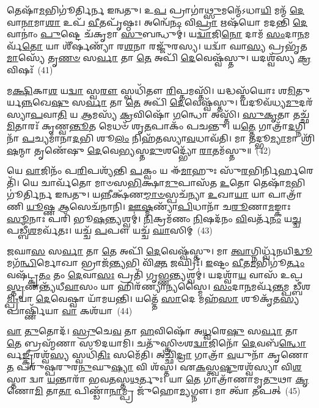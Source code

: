 𑌤𑍇𑌷𑌾᳴\-\ul{𑌮}\-𑌭𑌿𑌗𑍂॑𑌰𑍍𑌤𑌿𑌰𑍍𑌨 𑌇𑌨𑍍𑌵𑌤𑍁। 𑌉\-\ul{𑌪} 𑌪𑍍𑌰𑌾𑌗𑌾॑\-\ul{𑌥𑍍𑌸𑍁}\-𑌮𑌨𑍍𑌮𑍇᳴\-𑌽𑌧𑌾\-\ul{𑌯𑌿} 𑌮𑌨𑍍𑌮᳴ \ul{𑌦𑍇}\-𑌵𑌾\-\ul{𑌨𑌾}\-𑌮𑌾\-\ul{𑌶𑌾} 𑌉𑌪᳴ \ul{𑌵𑍀}\-𑌤𑌪𑍃᳴𑌷𑍍𑌠𑌃। 𑌅𑌨𑍍𑌵𑍇᳴\-\ul{𑌨𑌂} 𑌵𑌿\-\ul{𑌪𑍍𑌰𑌾} 𑌋𑌷᳴𑌯𑍋 𑌮𑌦𑌨𑍍𑌤𑌿 \ul{𑌦𑍇}\-𑌵𑌾𑌨𑌾𑌂॑ \ul{𑌪𑍁}\-𑌷𑍍𑌟𑍇 𑌚᳴𑌕𑍃𑌮𑌾 \ul{𑌸𑍁}\-𑌬𑌨𑍍𑌧𑍁𑌮𑍍॑। 𑌯\-\ul{𑌦𑍍𑌵𑌾}\-𑌜𑌿\-\ul{𑌨𑍋} 𑌦𑌾𑌮᳴ \ul{𑌸𑌂}\-𑌦𑌾\-\ul{𑌨}\-𑌮𑌰𑍍𑌵᳴\-\ul{𑌤𑍋} 𑌯𑌾 𑌶𑍀᳴𑌰𑍍\mbox{}\-\ul{𑌷}\-𑌣𑍍𑌯𑌾᳴ 𑌰\-\ul{𑌶}\-𑌨𑌾 𑌰𑌜𑍍𑌜𑍁᳴𑌰𑌸𑍍𑌯। 𑌯𑌦𑍍𑌵𑌾᳴ 𑌘𑌾\-\ul{𑌸𑍍𑌯} 𑌪𑍍𑌰𑌭𑍃᳴𑌤\-\ul{𑌮𑌾}\-𑌸𑍍𑌯𑍇᳴ 𑌤𑍃\-\ul{𑌣}\-\-\ul{𑍞} 𑌸\-\ul{𑌰𑍍𑌵𑌾} 𑌤𑌾 \ul{𑌤𑍇} 𑌅𑌪𑌿᳴ \ul{𑌦𑍇}\-𑌵𑍇𑌷𑍍𑌵᳴𑌸𑍍𑌤𑍁। 𑌯𑌦𑌶𑍍𑌵᳴𑌸𑍍𑌯 \ul{𑌕𑍍𑌰}\-𑌵𑌿𑌷𑌃᳴~(41)

𑌮\-\ul{𑌕𑍍𑌷𑌿}\-𑌕𑌾\-\ul{𑌶} 𑌯\-\ul{𑌦𑍍𑌵𑌾} 𑌸𑍍𑌵\-\ul{𑌰𑍗} 𑌸𑍍𑌵𑌧𑌿᳴𑌤𑍗 \ul{𑌰𑌿}\-𑌪𑍍𑌤𑌮𑌸𑍍𑌤𑌿᳴। 𑌯𑌦𑍍𑌧𑌸𑍍𑌤᳴𑌯𑍋𑌃 𑌶\-\ul{𑌮𑌿}\-𑌤𑍁𑌰𑍍𑌯\-\ul{𑌨𑍍𑌨}\-𑌖𑍇\-\ul{𑌷𑍁} 𑌸\-\ul{𑌰𑍍𑌵𑌾} 𑌤𑌾 \ul{𑌤𑍇} 𑌅𑌪𑌿᳴ \ul{𑌦𑍇}\-𑌵𑍇𑌷𑍍𑌵᳴𑌸𑍍𑌤𑍁। 𑌯𑌦𑍂𑌵᳴𑌧𑍍𑌯\-\ul{𑌮𑍁}\-𑌦𑌰᳴𑌸𑍍𑌯𑌾\-\ul{𑌪}\-𑌵𑌾\-\ul{𑌤𑌿} 𑌯 \ul{𑌆}\-𑌮𑌸𑍍𑌯᳴ \ul{𑌕𑍍𑌰}\-𑌵𑌿𑌷𑍋᳴ \ul{𑌗}\-𑌨𑍍𑌧𑍋 𑌅𑌸𑍍𑌤𑌿᳴। \ul{𑌸𑍁}\-\-\ul{𑌕𑍃}\-𑌤𑌾 𑌤𑌚𑍍𑌛᳴\-\ul{𑌮𑌿}\-𑌤𑌾𑌰𑌃᳴ 𑌕𑍃𑌣𑍍𑌵\-\ul{𑌨𑍍𑌤𑍂}\-𑌤 𑌮𑍇𑌧𑍞᳴ 𑌶𑍃\-\ul{𑌤}\-𑌪𑌾𑌕𑌂᳴ 𑌪𑌚𑌨𑍍𑌤𑍁। 𑌯\-\ul{𑌤𑍍𑌤𑍇} 𑌗𑌾𑌤𑍍𑌰𑌾᳴\-\ul{𑌦}\-𑌗𑍍𑌨𑌿𑌨𑌾᳴ \ul{𑌪}\-𑌚𑍍𑌯𑌮𑌾᳴𑌨𑌾\-\ul{𑌦}\-𑌭𑌿 𑌶𑍂\-\ul{𑌲𑌂} 𑌨𑌿𑌹᳴𑌤𑌸𑍍𑌯𑌾\-\ul{𑌵}\-𑌧𑌾𑌵᳴𑌤𑌿। 𑌮𑌾 𑌤𑌦𑍍𑌭𑍂\-\ul{𑌮𑍍𑌯𑌾}\-𑌮𑌾 𑌶𑍍𑌰𑌿᳴\-\ul{𑌷}\-𑌨𑍍𑌮𑌾 𑌤𑍃𑌣𑍇᳴𑌷𑍁 \ul{𑌦𑍇}\-𑌵𑍇\-\ul{𑌭𑍍𑌯}\-𑌸𑍍𑌤\-\ul{𑌦𑍁}\-𑌶𑌦𑍍𑌭𑍍𑌯𑍋᳴ \ul{𑌰𑌾}\-𑌤𑌮᳴𑌸𑍍𑌤𑍁॥~(42)

{\anuvakamend[{𑌇\-\ul{𑌦𑍁}\-𑌤𑍋 \ul{𑌕𑍍𑌰}\-𑌵𑌿𑌷𑌃᳴ 𑌶𑍍𑌰𑌿𑌷\-\ul{𑌥𑍍𑌸}\-𑌪𑍍𑌤 𑌚᳴}]}%

𑌯𑍇 \ul{𑌵𑌾}\-𑌜𑌿𑌨𑌂᳴ 𑌪\-\ul{𑌰𑌿}\-𑌪𑌶𑍍𑌯᳴𑌨𑍍𑌤𑌿 \ul{𑌪}\-𑌕𑍍𑌵𑌂 𑌯 𑌈᳴\-\ul{𑌮𑌾}\-𑌹𑍁𑌃 𑌸𑍁᳴\-\ul{𑌰}\-𑌭𑌿𑌰𑍍𑌨𑌿𑌰𑍍\mbox{}\-\ul{𑌹}\-𑌰𑍇𑌤𑌿᳴। 𑌯𑍇 𑌚𑌾𑌰𑍍𑌵᳴𑌤𑍋 𑌮𑌾𑍞𑌸\-\ul{𑌭𑌿}\-𑌕𑍍𑌷𑌾\-\ul{𑌮𑍁}\-𑌪𑌾𑌸᳴𑌤 \ul{𑌉}\-𑌤𑍋 𑌤𑍇𑌷𑌾᳴\-\ul{𑌮}\-𑌭𑌿𑌗𑍂॑𑌰𑍍𑌤𑌿𑌰𑍍𑌨 𑌇𑌨𑍍𑌵𑌤𑍁। 𑌯𑌨𑍍𑌨𑍀𑌕𑍍𑌷᳴𑌣\-\ul{𑌮𑍍𑌮𑌾}\-\-\ul{𑍞}\-𑌸𑍍𑌪𑌚᳴𑌨𑍍𑌯𑌾 \ul{𑌉}\-𑌖𑌾\-\ul{𑌯𑌾} 𑌯𑌾 𑌪𑌾𑌤𑍍𑌰𑌾᳴𑌣𑌿 \ul{𑌯𑍂}\-𑌷𑍍𑌣 \ul{𑌆}\-𑌸𑍇𑌚᳴𑌨𑌾𑌨𑌿। \ul{𑌊}\-\-\ul{𑌷𑍍𑌮}\-𑌣𑍍𑌯𑌾᳴\-\ul{𑌪𑌿}\-𑌧𑌾𑌨𑌾᳴ 𑌚\-\ul{𑌰𑍂}\-𑌣𑌾\-\ul{𑌮}\-𑌙𑍍𑌕𑌾𑌃 \ul{𑌸𑍂}\-𑌨𑌾𑌃 𑌪𑌰𑌿᳴ 𑌭𑍂\-\ul{𑌷}\-𑌨𑍍𑌤𑍍𑌯𑌶𑍍𑌵𑌮𑍍॑। \ul{𑌨𑌿}\-𑌕𑍍𑌰𑌮᳴𑌣𑌂 \ul{𑌨𑌿}\-𑌷𑌦᳴𑌨𑌂 \ul{𑌵𑌿}\-𑌵𑌰𑍍𑌤᳴\-\ul{𑌨𑌂} 𑌯\-\ul{𑌚𑍍𑌚} 𑌪𑌡𑍍𑌬𑍀᳴\-\ul{𑌶}\-𑌮𑌰𑍍𑌵᳴𑌤𑌃। 𑌯𑌚𑍍𑌚᳴ \ul{𑌪}\-𑌪𑍗 𑌯𑌚𑍍𑌚᳴ \ul{𑌘𑌾}\-𑌸𑌿𑌮𑍍~(43)

\-\ul{𑌜}\-𑌘𑌾\-\ul{𑌸} 𑌸\-\ul{𑌰𑍍𑌵𑌾} 𑌤𑌾 \ul{𑌤𑍇} 𑌅𑌪𑌿᳴ \ul{𑌦𑍇}\-𑌵𑍇𑌷𑍍𑌵᳴𑌸𑍍𑌤𑍁। 𑌮𑌾 \ul{𑌤𑍍𑌵𑌾}\-𑌗𑍍𑌨𑌿𑌰𑍍𑌧𑍍𑌵᳴𑌨𑌯𑌿\-\ul{𑌦𑍍𑌧𑍂}\-𑌮𑌗᳴\-\ul{𑌨𑍍𑌧𑌿}\-𑌰𑍍𑌮𑍋𑌖𑌾 𑌭𑍍𑌰𑌾𑌜᳴\-\ul{𑌨𑍍𑌤𑍍𑌯}\-𑌭𑌿 𑌵𑌿᳴\-\ul{𑌕𑍍𑌤} 𑌜𑌘𑍍𑌰𑌿𑌃᳴। \ul{𑌇}\-𑌷𑍍𑌟𑌂 \ul{𑌵𑍀}\-𑌤\-\ul{𑌮}\-𑌭𑌿𑌗𑍂॑\-\ul{𑌰𑍍𑌤𑌂} 𑌵𑌷᳴𑌟𑍍𑌕𑍃\-\ul{𑌤𑌂} 𑌤𑌂 \ul{𑌦𑍇}\-𑌵𑌾\-\ul{𑌸𑌃} 𑌪𑍍𑌰𑌤𑌿᳴ 𑌗𑍃\-\ul{𑌭𑍍𑌣}\-𑌨𑍍𑌤𑍍𑌯𑌶𑍍𑌵𑌮𑍍॑। 𑌯𑌦𑌶𑍍𑌵𑌾᳴\-\ul{𑌯} 𑌵𑌾𑌸᳴ 𑌉𑌪\-\ul{𑌸𑍍𑌤𑍃}\-𑌣𑌨𑍍𑌤𑍍𑌯᳴𑌧𑍀\-\ul{𑌵𑌾}\-𑌸𑌂 𑌯𑌾 𑌹𑌿𑌰᳴𑌣𑍍𑌯𑌾𑌨𑍍𑌯𑌸𑍍𑌮𑍈। \ul{𑌸𑌂}\-𑌦𑌾\-\ul{𑌨}\-𑌮𑌰𑍍𑌵᳴\-\ul{𑌨𑍍𑌤}\-𑌮𑍍𑌪𑌡𑍍𑌬𑍀᳴𑌶\-\ul{𑌮𑍍𑌪𑍍𑌰𑌿}\-𑌯𑌾 \ul{𑌦𑍇}\-𑌵𑍇𑌷𑍍𑌵𑌾 𑌯𑌾᳴𑌮𑌯𑌨𑍍𑌤𑌿। 𑌯𑌤𑍍𑌤𑍇᳴ \ul{𑌸𑌾}\-𑌦𑍇 𑌮𑌹᳴\-\ul{𑌸𑌾} 𑌶𑍂𑌕𑍃᳴𑌤\-\ul{𑌸𑍍𑌯} 𑌪𑌾𑌰𑍍𑌷𑍍𑌣𑌿᳴𑌯𑌾 \ul{𑌵𑌾} 𑌕𑌶᳴𑌯𑌾~(44)

\-\ul{𑌵𑌾} \ul{𑌤𑍁}\-𑌤𑍋𑌦᳴। \ul{𑌸𑍍𑌰𑍁}\-𑌚𑍇\-\ul{𑌵} 𑌤𑌾 \ul{𑌹}\-𑌵𑌿𑌷𑍋᳴ 𑌅\-\ul{𑌧𑍍𑌵}\-𑌰𑍇\-\ul{𑌷𑍁} 𑌸\-\ul{𑌰𑍍𑌵𑌾} 𑌤𑌾 \ul{𑌤𑍇} 𑌬𑍍𑌰𑌹𑍍𑌮᳴𑌣𑌾 𑌸𑍂𑌦𑌯𑌾𑌮𑌿। 𑌚𑌤𑍁᳴𑌸𑍍𑌤𑍍𑌰𑌿𑍞𑌶\-\ul{𑌦𑍍𑌵𑌾}\-𑌜𑌿𑌨𑍋᳴ \ul{𑌦𑍇}\-𑌵𑌬᳴\-\ul{𑌨𑍍𑌧𑍋}\-𑌰𑍍𑌵\-\ul{𑌙𑍍𑌕𑍍𑌰𑍀}\-𑌰𑌶𑍍𑌵᳴\-\ul{𑌸𑍍𑌯} 𑌸𑍍𑌵𑌧𑌿᳴\-\ul{𑌤𑌿𑌃} 𑌸𑌮𑍇᳴𑌤𑌿। 𑌅𑌚𑍍𑌛𑌿᳴\-\ul{𑌦𑍍𑌰𑌾} 𑌗𑌾𑌤𑍍𑌰𑌾᳴ \ul{𑌵}\-𑌯𑍁𑌨𑌾᳴ 𑌕𑍃𑌣𑍋\-\ul{𑌤} 𑌪𑌰𑍁᳴𑌷𑍍𑌪𑌰𑍁𑌰\-\ul{𑌨𑍁}\-𑌘𑍁\-\ul{𑌷𑍍𑌯𑌾} 𑌵𑌿 𑌶᳴𑌸𑍍𑌤। 𑌏\-\ul{𑌕}\-𑌸𑍍𑌤𑍍𑌵\-\ul{𑌷𑍍𑌟𑍁}\-𑌰𑌶𑍍𑌵᳴𑌸𑍍𑌯𑌾 𑌵𑌿\-\ul{𑌶}\-𑌸𑍍𑌤𑌾 𑌦𑍍𑌵𑌾 \ul{𑌯}\-𑌨𑍍𑌤𑌾𑌰𑌾᳴ 𑌭𑌵\-\ul{𑌤}\-𑌸𑍍𑌤\-\ul{𑌥}\-𑌰𑍍𑌤𑍁𑌃। 𑌯𑌾 \ul{𑌤𑍇} 𑌗𑌾𑌤𑍍𑌰𑌾᳴𑌣𑌾𑌮𑍃\-\ul{𑌤𑍁}\-𑌥𑌾 \ul{𑌕𑍃}\-𑌣𑍋\-\ul{𑌮𑌿} 𑌤𑌾\-\ul{𑌤𑌾} 𑌪𑌿𑌣𑍍𑌡𑌾᳴\-\ul{𑌨𑌾}\-𑌮𑍍𑌪𑍍𑌰 𑌜𑍁᳴𑌹𑍋\-\ul{𑌮𑍍𑌯}\-𑌗𑍍𑌨𑍗। 𑌮𑌾 𑌤𑍍𑌵𑌾᳴ 𑌤𑌪𑌤𑍍~(45)


